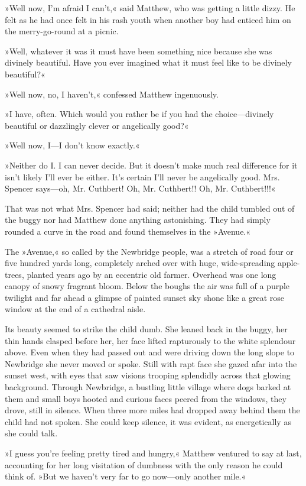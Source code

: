 »Well now, I'm afraid I can't,« said Matthew, who was getting a little dizzy. He felt as he had once felt in his rash youth when another boy had enticed him on the merry-go-round at a picnic.

»Well, whatever it was it must have been something nice because she was divinely beautiful. Have you ever imagined what it must feel like to be divinely beautiful?«

»Well now, no, I haven't,« confessed Matthew ingenuously.

»I have, often. Which would you rather be if you had the choice—divinely beautiful or dazzlingly clever or angelically good?«

»Well now, I—I don't know exactly.«

»Neither do I. I can never decide. But it doesn't make much real difference for it isn't likely I'll ever be either. It's certain I'll never be angelically good. Mrs. Spencer says—oh, Mr. Cuthbert! Oh, Mr. Cuthbert!! Oh, Mr. Cuthbert!!!«

That was not what Mrs. Spencer had said; neither had the child tumbled out of the buggy nor had Matthew done anything astonishing. They had simply rounded a curve in the road and found themselves in the »Avenue.«

The »Avenue,« so called by the Newbridge people, was a stretch of road four or five hundred yards long, completely arched over with huge, wide-spreading apple-trees, planted years ago by an eccentric old farmer. Overhead was one long canopy of snowy fragrant bloom. Below the boughs the air was full of a purple twilight and far ahead a glimpse of painted sunset sky shone like a great rose window at the end of a cathedral aisle.

Its beauty seemed to strike the child dumb. She leaned back in the buggy, her thin hands clasped before her, her face lifted rapturously to the white splendour above. Even when they had passed out and were driving down the long slope to Newbridge she never moved or spoke. Still with rapt face she gazed afar into the sunset west, with eyes that saw visions trooping splendidly across that glowing background. Through Newbridge, a bustling little village where dogs barked at them and small boys hooted and curious faces peered from the windows, they drove, still in silence. When three more miles had dropped away behind them the child had not spoken. She could keep silence, it was evident, as energetically as she could talk.

»I guess you're feeling pretty tired and hungry,« Matthew ventured to say at last, accounting for her long visitation of dumbness with the only reason he could think of. »But we haven't very far to go now—only another mile.«

